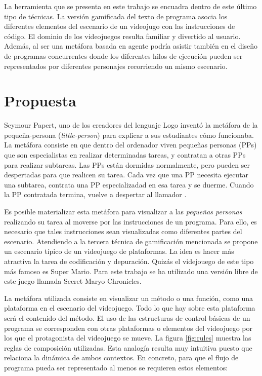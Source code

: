 \documentclass{llncs}
\begin{document}
La herramienta que se presenta en este trabajo se encuadra dentro de este último tipo de técnicas. La versión gamificada del texto de programa asocia los diferentes elementos del escenario de un videojugo con las instrucciones de código. El dominio de los videojuegos resulta familiar y divertido al usuario. Además, al ser una metáfora basada en agente \cite{travers1996programming} podría asistir también en el diseño de programas concurrentes donde los diferentes hilos de ejecución pueden ser representados por diferentes personajes recorriendo un mismo escenario.



\section{Propuesta}
\label{sec:proposal}

Seymour Papert, uno de los creadores del lenguaje Logo inventó la
metáfora de la pequeña-persona ({\em little-person}) para explicar a
sus estudiantes cómo funcionaba. La metáfora consiste en que dentro del ordenador viven pequeñas personas (PPs) que son especialistas en
realizar determinadas tareas, y contratan a otras PPs para realizar
subtareas. Las PPs están dormidas normalmente, pero pueden ser
despertadas para que realicen su tarea. Cada vez que una PP necesita
ejecutar una subtarea, contrata una PP especializadad en esa tarea y
se duerme. Cuando la PP contratada termina, vuelve a despertar al
llamador \cite{harvey1985computer}.

Es posible materializar esta metáfora para visualizar a las \emph{pequeñas personas} realizando su tarea al moverse por las instrucciones de un programa. Para ello, es necesario que tales instrucciones sean visualizadas como diferentes partes del escenario. Atendiendo a la tercera técnica de gamificación mencionada se propone un escenario típico de un videojuego de plataformas. La idea es hacer más atractiva la tarea de codificación y depuración. Quizás el videjouego de este tipo más famoso es Super Mario. Para este trabajo se ha utilizado una versión libre de este juego llamada Secret Maryo Chronicles.

La metáfora utilizada consiste en visualizar un método o una función, como una plataforma en el escenario del videojuego. Todo lo que hay sobre esta plataforma será el contenido del método. El uso de las estructuras de control básicas de un programa se corresponden con otras plataformas o elementos del videojuego por los que el protagonista del videojuego se mueve.  La figura \ref{fig:rules} muestra las reglas de composición utilizadas. Esta analogía resulta muy intuitiva puesto que relaciona la dinámica de ambos contextos. En concreto, para que el flujo de programa pueda ser representado al menos se requieren estos elementos: 
\end{document}
